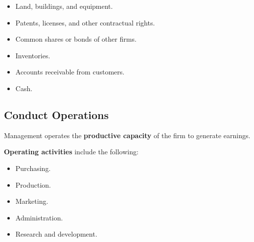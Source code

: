 \documentclass{article}\usepackage[]{graphicx}\usepackage[]{xcolor}
\begin{document}
\begin{itemize}
  \item Land, buildings, and equipment.
  \item Patents, licenses, and other contractual rights.
  \item Common shares or bonds of other firms.
  \item Inventories.
  \item Accounts receivable from customers.
  \item Cash.
\end{itemize}

\subsection{Conduct Operations}

Management operates the \textbf{productive capacity} of the firm to generate earnings.\par

\textbf{Operating activities} include the following:

\begin{itemize}
  \item Purchasing.
  \item Production.
  \item Marketing.
  \item Administration.
  \item Research and development.
\end{itemize}




















% 
% 
\end{document}
